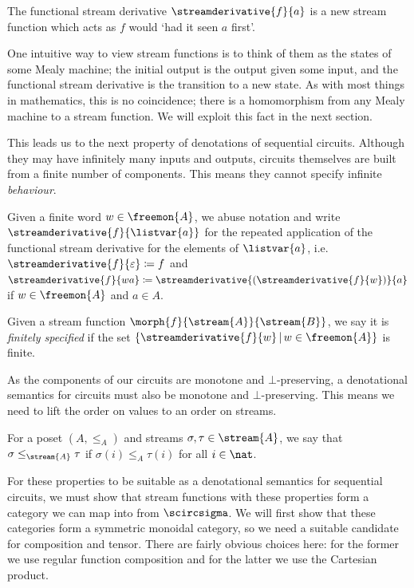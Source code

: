 \documentclass{lmcs}
\begin{document}
The functional stream derivative \(\streamderivative{f}{a}\) is a new stream
function which acts as \(f\) would `had it seen \(a\) first'.

\begin{rem}
    One intuitive way to view stream functions is to think of them as the states
    of some Mealy machine; the initial output is the output given some input,
    and the functional stream derivative is the transition to a new state.
    As with most things in mathematics, this is no coincidence; there is a
    homomorphism from any Mealy machine to a stream function.
    We will exploit this fact in the next section.
\end{rem}

This leads us to the next property of denotations of sequential circuits.
Although they may have infinitely many inputs and outputs, circuits themselves
are built from a finite number of components.
This means they cannot specify infinite \emph{behaviour}.

\begin{nota}
    Given a finite word \(w \in \freemon{A}\), we abuse notation
    and write \(\streamderivative{f}{\listvar{a}}\) for the repeated
    application of the functional stream derivative for the elements of
    \(\listvar{a}\), i.e.\ \(
    \streamderivative{f}{\varepsilon} \coloneqq f
    \) and \(
    \streamderivative{f}{wa} \coloneqq
    \streamderivative{(\streamderivative{f}{w})}{a}
    \)
    if \(w \in \freemon{A}\) and \(a \in A\).
\end{nota}

\begin{defi}
    Given a stream function \(\morph{f}{\stream{A}}{\stream{B}}\), we say it is
    \emph{finitely specified} if the set \(\{
    \streamderivative{f}{w} \,|\, w \in \freemon{A}
    \}\) is finite.
\end{defi}

As the components of our circuits are monotone and \(\bot\)-preserving, a
denotational semantics for circuits must also be monotone and
\(\bot\)-preserving.
This means we need to lift the order on values to an order on streams.

\begin{nota}
    For a poset \((A, \leq_A)\) and streams \(\sigma,\tau \in \stream{A}\), we
    say that \(\sigma \leq_{\stream{A}} \tau\) if \(\sigma(i) \leq_A \tau(i)\)
    for all \(i \in \nat\).
\end{nota}

For these properties to be suitable as a denotational semantics for
sequential circuits, we must show that stream functions with these
properties form a category we can map into from \(\scircsigma\).
We will first show that these categories form a symmetric monoidal category, so
we need a suitable candidate for composition and tensor.
There are fairly obvious choices here: for the former we use regular function
composition and for the latter we use the Cartesian product.
\end{document}
